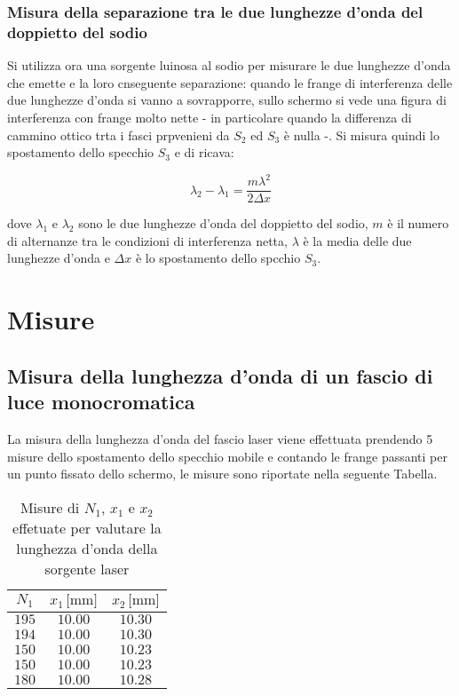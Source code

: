\documentclass[]{article}
\let\oldsection\section%
\renewcommand{\section}{%
	\renewcommand{\theequation}{\thesection.\arabic{equation}}%
	\oldsection}%
\let\oldsubsection\subsection%
\renewcommand{\subsection}{%
	\renewcommand{\theequation}{\thesubsection.\arabic{equation}}%
	\oldsubsection}%
\begin{document}
\subsubsection{Misura della separazione tra le due lunghezze d'onda del doppietto del sodio}

Si utilizza ora una sorgente luinosa al sodio per misurare le due lunghezze d'onda che emette e la loro cnseguente separazione: quando le frange di interferenza delle due lunghezze d'onda si vanno a sovrapporre, sullo schermo si vede una figura di interferenza con frange molto nette - in particolare quando la differenza di cammino ottico trta i fasci prpvenieni da $S_2$ ed $S_3$ è nulla -. 
Si misura quindi lo spostamento dello specchio $S_3$ e di ricava:

\begin{equation}
    \label{Delta_lambda}
    \lambda _2 - \lambda _1 = \frac {m \lambda ^2 }{2 \Delta x}
\end{equation}

dove $\lambda _1$ e $\lambda _2$ sono le due lunghezze d'onda del doppietto del sodio, $m$ è il numero di alternanze tra le condizioni di interferenza netta, $\lambda$ è la media delle due lunghezze d'onda e $\Delta x$ è lo spostamento dello spcchio $S_3$.

\section{Misure}

\subsection {Misura della lunghezza d'onda di un fascio di luce monocromatica}

La misura della lunghezza d'onda del fascio laser viene effettuata prendendo 5 misure dello spostamento dello specchio mobile e contando le frange passanti per un punto fissato dello schermo, le misure sono riportate nella seguente Tabella.

\begin{table}[H]
    \centering

    \begin{tabular}{||c|c|c||}
        \hline
        $N_1 $ & $x_1 \, \text{[mm]}$ & $x_2\, \text{[mm]}$ \\
        \hline\hline

        $195$ & $10.00$ & $10.30$ \\\hline
        $194$ & $10.00$ & $10.30$ \\\hline
        $150$ & $10.00$ & $10.23$ \\\hline
        $150$ & $10.00$ & $10.23$ \\\hline
        $180$ & $10.00$ & $10.28$ \\\hline
    
    \end{tabular}
    \caption{Misure di $N_1$, $x_1$ e $x_2$ effetuate per valutare la lunghezza d'onda della sorgente laser}
    \label{lambda}    
\end{table}
\end{document}
